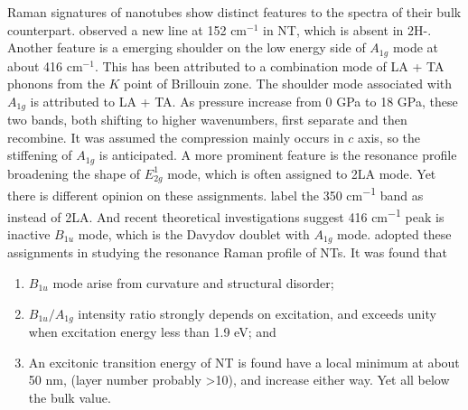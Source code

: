 Raman signatures of  nanotubes show distinct features to the spectra of their bulk counterpart. \citeauthor{JMR7990865} observed a new line at 152 cm$^{-1}$ in  NT, which is absent in 2H-.\cite{JMR7990865} Another feature is a emerging shoulder on the low energy side of $A_{1g}$ mode at about 416 cm$^{-1}$. This has been attributed to a combination mode of LA + TA phonons from the $K$ point of Brillouin zone.\cite{Sourisseau1991} The shoulder mode associated with $A_{1g}$ is attributed to LA + TA. As pressure increase from 0 GPa to 18 GPa, these two bands, both shifting to higher wavenumbers, first separate and then recombine. It was assumed the compression mainly occurs in $c$ axis, so the stiffening of $A_{1g}$ is anticipated. A more prominent feature is the resonance profile broadening the shape of $E_{2g}^1$ mode, which is often assigned to 2LA mode. Yet there is different opinion on these assignments. \citeauthor{Molina-Sanchez2011} label the 350 \si{cm^{-1}} band as  instead of 2LA.\cite{Molina-Sanchez2011} And recent theoretical investigations suggest 416 \si{cm^{-1}} peak is inactive $B_{1u}$ mode\cite{Molina-Sanchez2011,Ataca2012}, which is the Davydov doublet with $A_{1g}$ mode. \citeauthor{Staiger2012} adopted these assignments in studying the resonance Raman profile of  NTs.\cite{Staiger2012} It was found that
\begin{enumerate}
\item $B_{1u}$ mode arise from curvature and structural disorder;
\item $B_{1u}/A_{1g}$ intensity ratio strongly depends on excitation, and exceeds unity when excitation energy less than 1.9 eV; and
\item  An excitonic transition energy of NT is found have a local minimum at about 50 nm, (layer number probably \textgreater 10), and increase either way. Yet all below the bulk value.
\end{enumerate}

